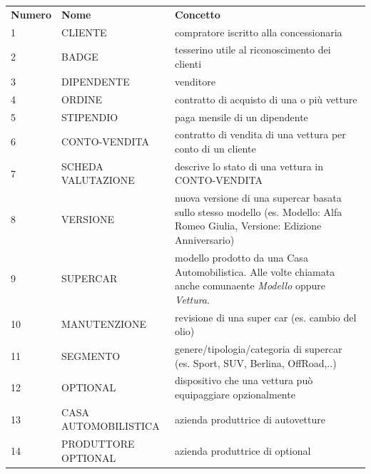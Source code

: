 \documentclass[11pt]{article}
\begin{document}
\newpage


\renewcommand{\arraystretch}{1.5}

\begin{table}[htbp]
    \centering
    \small
    \begin{tabularx}{\linewidth}{l l X}
        \rowcolor{red!20!}
        \textbf{Numero} & \textbf{Nome} & \textbf{Concetto} \\
        1 & CLIENTE & compratore iscritto alla concessionaria \\
        2 & BADGE & tesserino utile al riconoscimento dei clienti \\
        3 & DIPENDENTE & venditore \\
        4 & ORDINE & contratto di acquisto di una o più vetture \\
        5 & STIPENDIO & paga mensile di un dipendente \\
        6 & CONTO-VENDITA & contratto di vendita di una vettura per conto
        di un cliente \\
        7 & SCHEDA VALUTAZIONE & descrive lo stato di una vettura in
        CONTO-VENDITA\\
        8 & VERSIONE & nuova versione di una supercar basata sullo stesso
        modello (es. Modello: Alfa Romeo Giulia, Versione: Edizione Anniversario) \\
        9 & SUPERCAR & modello prodotto da una Casa Automobilistica. Alle
        volte chiamata anche comunaente \textit{Modello} oppure \textit{Vettura}. \\
        10 & MANUTENZIONE & revisione di una super car (es. cambio del
        olio) \\
        11 & SEGMENTO & genere/tipologia/categoria di supercar (es. Sport, SUV, Berlina, OffRoad,..)\\
        12 & OPTIONAL & dispositivo che una vettura può equipaggiare
        opzionalmente \\
        13 & CASA AUTOMOBILISTICA & azienda produttrice di autovetture \\
        14 & PRODUTTORE OPTIONAL & azienda produttrice di optional \\
    \end{tabularx}
    \label{tab:tabella_linguaggio}
\end{table}
\end{document}
